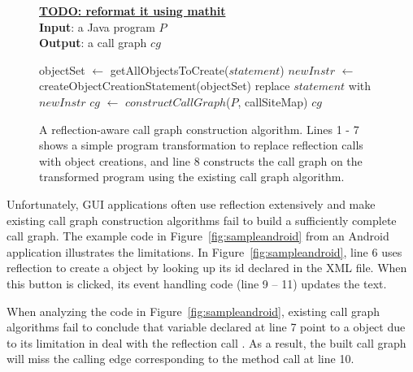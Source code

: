 

\begin{figure}[t]
\textbf{\underline{TODO: reformat it using mathit}}\\
\textbf{Input}: a Java program $P$\\
\textbf{Output}: a call graph $cg$\\
\vspace{-5mm}
\begin{algorithmic}[1]
\STATE objectSet $\leftarrow$ getAllObjectsToCreate($statement$)
\STATE $newInstr$ $\leftarrow$ createObjectCreationStatement(objectSet)
\STATE replace $statement$ with $newInstr$
\ENDIF
\ENDFOR
\STATE $cg$ $\leftarrow$ $constructCallGraph$($P$, callSiteMap)
\RETURN $cg$
\vspace{-2mm}
\end{algorithmic}
\caption{A reflection-aware call graph construction algorithm. Lines 1
- 7 shows a simple program transformation to replace reflection calls
with object creations, and line 8 constructs the call graph on
the transformed program using the existing call graph algorithm. 
} 
\label{fig:cgalgorithm}
\end{figure}

Unfortunately, GUI applications often use reflection extensively and make
existing call graph construction algorithms fail to build a sufficiently complete
call graph. The example code in Figure~\ref{fig:sampleandroid} from an Android application
 illustrates the limitations.
In Figure~\ref{fig:sampleandroid}, line 6 uses reflection to create a 
object by looking up its id declared in the XML file. When this button
is clicked, its event handling code (line 9 -- 11) updates the text.

When analyzing the code in Figure~\ref{fig:sampleandroid}, existing call graph algorithms
fail to conclude that variable  declared at line 7
point to a  object due to its limitation in deal with the
reflection call . As a result, the built 
call graph will miss the calling edge corresponding to the method
call  at line 10. 

